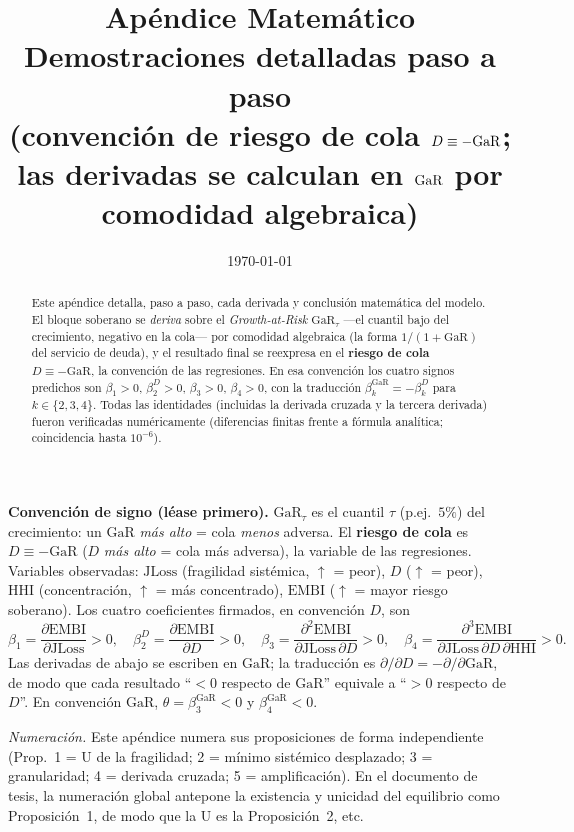 \documentclass[11pt]{article}
\title{\textbf{Apéndice Matemático}\\[4pt]
\large Demostraciones detalladas paso a paso\\
\normalsize (convención de riesgo de cola $D\equiv-\GaR$; las derivadas se calculan en $\GaR$ por comodidad algebraica)}
\author{}
\date{\today}
\theoremstyle{plain}
\theoremstyle{definition}
\newcommand{\JLoss}{\mathrm{JLoss}}
\newcommand{\EMBI}{\mathrm{EMBI}}
\newcommand{\GaR}{\mathrm{GaR}}
\newcommand{\HHI}{\mathrm{HHI}}
\newcommand{\1}{\mathbf{1}}
\begin{document}
\maketitle
\vspace{-2em}

\begin{abstract}
\noindent Este apéndice detalla, paso a paso, cada derivada y conclusión matemática del modelo. El bloque soberano se \emph{deriva} sobre el \emph{Growth-at-Risk} $\GaR_\tau$ ---el cuantil bajo del crecimiento, negativo en la cola--- por comodidad algebraica (la forma $1/(1+\GaR)$ del servicio de deuda), y el resultado final se reexpresa en el \textbf{riesgo de cola} $D\equiv-\GaR$, la convención de las regresiones. En esa convención los cuatro signos predichos son $\beta_1>0$, $\beta_2^{D}>0$, $\beta_3>0$, $\beta_4>0$, con la traducción $\beta_k^{\GaR}=-\beta_k^{D}$ para $k\in\{2,3,4\}$. Todas las identidades (incluidas la derivada cruzada y la tercera derivada) fueron verificadas numéricamente (diferencias finitas frente a fórmula analítica; coincidencia hasta $10^{-6}$).
\end{abstract}

\begin{mdframed}
\textbf{Convención de signo (léase primero).} $\GaR_\tau$ es el cuantil $\tau$ (p.ej.\ $5\%$) del crecimiento: un $\GaR$ \emph{más alto} = cola \emph{menos} adversa. El \textbf{riesgo de cola} es $D\equiv-\GaR$ ($D$ \emph{más alto} = cola más adversa), la variable de las regresiones. Variables observadas: $\JLoss$ (fragilidad sistémica, $\uparrow$ = peor), $D$ ($\uparrow$ = peor), $\HHI$ (concentración, $\uparrow$ = más concentrado), $\EMBI$ ($\uparrow$ = mayor riesgo soberano). Los cuatro coeficientes firmados, en convención $D$, son
\[
\beta_1=\frac{\partial \EMBI}{\partial \JLoss}>0,\quad
\beta_2^{D}=\frac{\partial \EMBI}{\partial D}>0,\quad
\beta_3=\frac{\partial^2 \EMBI}{\partial \JLoss\,\partial D}>0,\quad
\beta_4=\frac{\partial^3 \EMBI}{\partial \JLoss\,\partial D\,\partial \HHI}>0.
\]
Las derivadas de abajo se escriben en $\GaR$; la traducción es $\partial/\partial D=-\partial/\partial\GaR$, de modo que cada resultado ``$<0$ respecto de $\GaR$'' equivale a ``$>0$ respecto de $D$''. En convención $\GaR$, $\theta=\beta_3^{\GaR}<0$ y $\beta_4^{\GaR}<0$.

\medskip\noindent\emph{Numeración.} Este apéndice numera sus proposiciones de forma independiente (Prop.~1 = U de la fragilidad; 2 = mínimo sistémico desplazado; 3 = granularidad; 4 = derivada cruzada; 5 = amplificación). En el documento de tesis, la numeración global antepone la existencia y unicidad del equilibrio como Proposición~1, de modo que la U es la Proposición~2, etc.
\end{mdframed}
\end{document}
